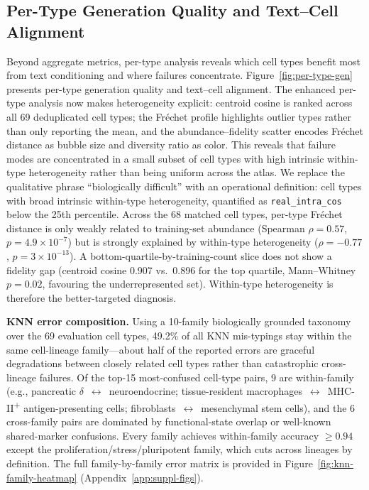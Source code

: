 \documentclass[11pt,a4paper]{article}
\begin{document}
\subsection{Per-Type Generation Quality and Text--Cell Alignment}\label{sec:per-type}

Beyond aggregate metrics, per-type analysis reveals which cell types benefit most from text conditioning and where failures concentrate. Figure~\ref{fig:per-type-gen} presents per-type generation quality and text--cell alignment. The enhanced per-type analysis now makes heterogeneity explicit: centroid cosine is ranked across all 69 deduplicated cell types; the Fr\'echet profile highlights outlier types rather than only reporting the mean, and the abundance--fidelity scatter encodes Fr\'echet distance as bubble size and diversity ratio as color. This reveals that failure modes are concentrated in a small subset of cell types with high intrinsic within-type heterogeneity rather than being uniform across the atlas. We replace the qualitative phrase ``biologically difficult'' with an operational definition: cell types with broad intrinsic within-type heterogeneity, quantified as \texttt{real\_intra\_cos} below the 25th percentile. Across the 68 matched cell types, per-type Fr\'echet distance is only weakly related to training-set abundance (Spearman $\rho = 0.57$, $p = 4.9\times10^{-7}$) but is strongly explained by within-type heterogeneity ($\rho = -0.77$, $p = 3\times10^{-13}$). A bottom-quartile-by-training-count slice does not show a fidelity gap (centroid cosine 0.907 vs.\ 0.896 for the top quartile, Mann--Whitney $p = 0.02$, favouring the underrepresented set). Within-type heterogeneity is therefore the better-targeted diagnosis.

\textbf{KNN error composition.} Using a 10-family biologically grounded taxonomy over the 69 evaluation cell types, 49.2\% of all KNN mis-typings stay within the same cell-lineage family---about half of the reported errors are graceful degradations between closely related cell types rather than catastrophic cross-lineage failures. Of the top-15 most-confused cell-type pairs, 9 are within-family (e.g., pancreatic $\delta$~$\leftrightarrow$~neuroendocrine; tissue-resident macrophages~$\leftrightarrow$~MHC-II\textsuperscript{+} antigen-presenting cells; fibroblasts~$\leftrightarrow$~mesenchymal stem cells), and the 6 cross-family pairs are dominated by functional-state overlap or well-known shared-marker confusions. Every family achieves within-family accuracy $\geq 0.94$ except the proliferation/stress/pluripotent family, which cuts across lineages by definition. The full family-by-family error matrix is provided in Figure~\ref{fig:knn-family-heatmap} (Appendix~\ref{app:suppl-figs}).
\end{document}
